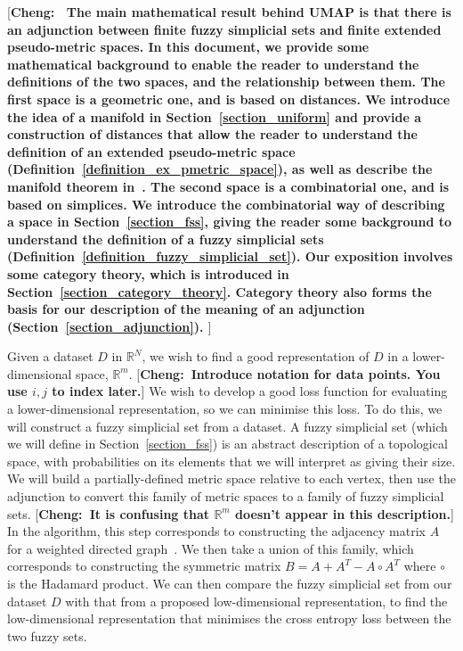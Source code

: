 \documentclass[a4paper,11pt,leqno]{article} \usepackage{amsmath}
\newcommand{\RR}{\mathbb{R}} \newcommand{\QQ}{\mathbb{Q}}
\theoremstyle{definition}
\newcommand{\cheng}[1]{ {\color{purple}[{\bf Cheng:~{#1}}]} }
\begin{document}
\cheng{
The main mathematical result behind UMAP is that there is an adjunction between
finite fuzzy simplicial sets and finite extended pseudo-metric spaces.
In this document, we provide some mathematical background to enable the reader
to understand the definitions of the two spaces, and the relationship between them.
The first space is a geometric one, and is based on distances.
We introduce the idea of a manifold in Section~\ref{section_uniform} and provide
a construction of distances that allow the reader to understand the definition of
an extended pseudo-metric space (Definition~\ref{definition_ex_pmetric_space}),
as well as describe the manifold theorem in~\cite{McInnes18}.
The second space is a combinatorial one, and is based on simplices.
We introduce the combinatorial way of describing a space in Section~\ref{section_fss},
giving the reader some background to understand the definition of a
fuzzy simplicial sets (Definition~\ref{definition_fuzzy_simplicial_set}).
Our exposition involves some category theory, which is introduced
in Section~\ref{section_category_theory}. Category theory also
forms the basis for our description of the meaning of an adjunction
(Section~\ref{section_adjunction}).
}

Given a dataset $D$ in $\RR^N$, we wish to find a good representation of $D$ in
a lower-dimensional space, $\RR^m$.
\cheng{Introduce notation for data points. You use $i,j$ to index later.}
We wish to develop a good loss function for evaluating a lower-dimensional
representation, so we can minimise this loss.
To do this, we will construct a fuzzy simplicial set from a dataset.
A fuzzy simplicial set (which we will define in Section~\ref{section_fss}) is
an abstract description of a topological space, with probabilities on its
elements that we will interpret as giving their size.
We will build a partially-defined metric space relative to each vertex, then
use the adjunction to convert this family of metric spaces to a family of fuzzy
simplicial sets.
\cheng{It is confusing that $\RR^m$ doesn't appear in this description.}
In the algorithm, this step corresponds to constructing the adjacency matrix
$A$ for a weighted directed graph~\cite[Section 3.1]{McInnes18}.
We then take a union of this family, which corresponds to constructing the
symmetric matrix $B = A+A^T-A\circ A^T$ where $\circ$ is the Hadamard product.
We can then compare the fuzzy simplicial set from our dataset $D$ with that
from a proposed low-dimensional representation, to find the low-dimensional
representation that minimises the cross entropy loss between the two fuzzy
sets.
\end{document}

